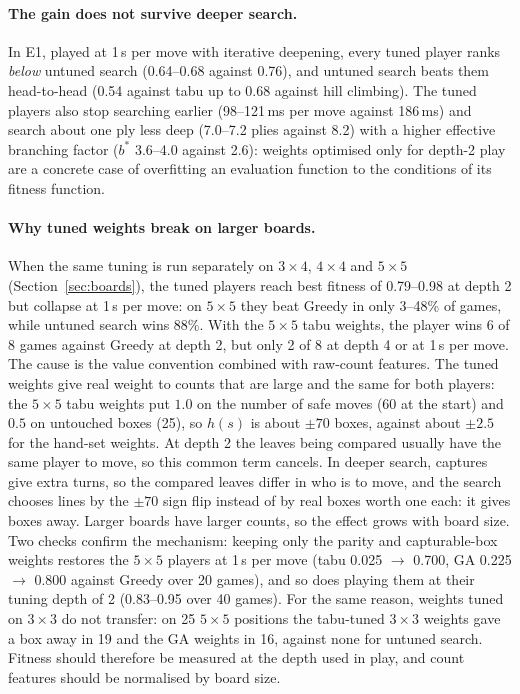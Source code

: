 \documentclass[11pt,a4paper]{article}
\newcommand{\bd}[2]{$#1{\times}#2$}            %
\begin{document}
\paragraph{The gain does not survive deeper search.} In E1, played at 1\,s per move with
iterative deepening, every tuned player ranks \emph{below} untuned search (0.64--0.68
against 0.76), and untuned search beats them head-to-head (0.54 against tabu up to 0.68
against hill climbing). The tuned players also stop searching earlier (98--121\,ms per
move against 186\,ms) and search about one ply less deep (7.0--7.2 plies against 8.2) with a
higher effective branching factor ($b^*$ 3.6--4.0 against 2.6): weights optimised only for
depth-2 play are a concrete case of overfitting an evaluation function to the conditions
of its fitness function.

\paragraph{Why tuned weights break on larger boards.} When the same tuning is run
separately on \bd{3}{4}, \bd{4}{4} and \bd{5}{5} (Section~\ref{sec:boards}), the tuned
players reach best fitness of 0.79--0.98 at depth 2 but collapse at 1\,s per move: on \bd{5}{5}
they beat Greedy in only 3--48\% of games, while untuned search wins 88\%. With the
\bd{5}{5} tabu weights, the player wins 6 of 8 games against Greedy at depth 2, but only 2
of 8 at depth 4 or at 1\,s per move. The cause is the value convention combined with
raw-count features. The tuned weights give real weight to counts that are large and the
same for both players: the \bd{5}{5} tabu weights put $1.0$ on the number of safe moves (60
at the start) and $0.5$ on untouched boxes (25), so $h(s)$ is about $\pm70$ boxes, against
about $\pm2.5$ for the hand-set weights. At depth 2 the leaves being compared usually have
the same player to move, so this common term cancels. In deeper search, captures give
extra turns, so the compared leaves differ in who is to move, and the search chooses
lines by the $\pm70$ sign flip instead of by real boxes worth one each: it gives boxes
away. Larger boards have larger counts, so the effect grows with board size. Two checks
confirm the mechanism: keeping only the parity and capturable-box weights restores the
\bd{5}{5} players at 1\,s per move (tabu 0.025 $\rightarrow$ 0.700, GA 0.225 $\rightarrow$
0.800 against Greedy over 20 games), and so does playing them at their tuning depth of 2
(0.83--0.95 over 40 games). For the same
reason, weights tuned on \bd{3}{3} do not transfer: on 25 \bd{5}{5} positions the
tabu-tuned \bd{3}{3} weights gave a box away in 19 and the GA weights in 16, against none
for untuned search. Fitness should therefore be measured at the depth used in play, and
count features should be normalised by board size.
\end{document}
